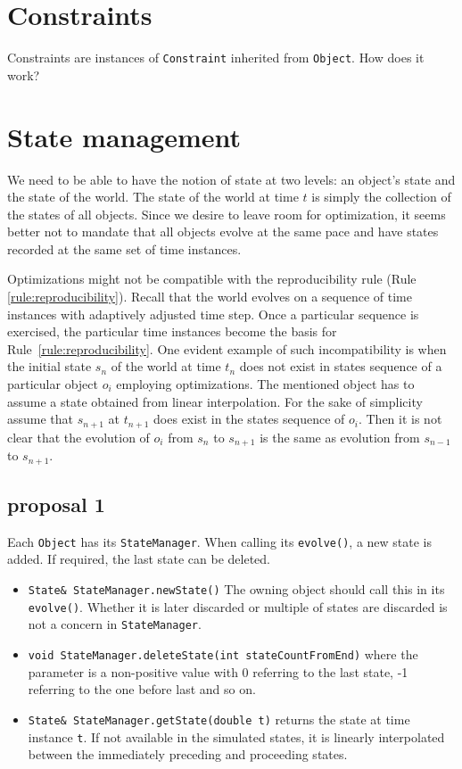 \documentclass[a4paper]{report}
\newcommand{\ai}[1]{{\color{blue}#1}}
\begin{document}
\chapter{Constraints}
Constraints are instances of \verb+Constraint+ inherited from \verb+Object+. \ai{How does it work?}

\chapter{State management}
We need to be able to have the notion of state at two levels: an object's state and the state of the world. The state of the world at time $t$ is simply the collection of the states of all objects. Since we desire to leave room for optimization, it seems better not to mandate that all objects evolve at the same pace and have states recorded at the same set of time instances.

Optimizations might not be compatible with the reproducibility rule (Rule \ref{rule:reproducibility}). Recall that the world evolves on a sequence of time instances with adaptively adjusted time step. Once a particular sequence is exercised, the particular time instances become the basis for Rule~\ref{rule:reproducibility}. One evident example of such incompatibility is when the initial state $s_n$ of the world at time $t_n$ does not exist in states sequence of a particular object $o_i$ employing optimizations. The mentioned object has to assume a state obtained from linear interpolation. For the sake of simplicity assume that $s_{n+1}$ at $t_{n+1}$ does exist in the states sequence of $o_i$. Then it is not clear that the evolution of $o_i$ from $s_n$ to $s_{n+1}$ is the same as evolution from $s_{n-1}$ to $s_{n+1}$. 

\section{proposal 1}
Each \verb+Object+ has its \verb+StateManager+. When calling its \verb+evolve()+, a new state is added. If required, the last state can be deleted. 

\begin{itemize}
	\item \verb+State& StateManager.newState()+ The owning object should call this in its \verb+evolve()+. Whether it is later discarded or multiple of states are discarded is not a concern in \verb+StateManager+.
	\item \verb+void StateManager.deleteState(int stateCountFromEnd)+ where the parameter is a non-positive value with 0 referring to the last state, -1 referring to the one before last and so on.
\item \verb+State& StateManager.getState(double t)+ returns the state at time instance \verb+t+. If not available in the simulated states, it is linearly interpolated between the immediately preceding and proceeding states.
\end{itemize}
\end{document}
